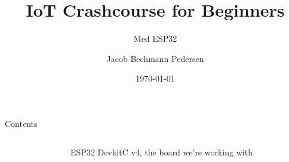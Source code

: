 \documentclass[aspectratio=169]{beamer}
\title{IoT Crashcourse for Beginners}
\subtitle{Med ESP32}
\author{Jacob Bechmann Pedersen}
\institute{Bechmann Engineering ApS}
\date{\today}
\begin{document}
\begin{frame}
	\titlepage
\end{frame}

\begin{frame}{Contents}
	\begin{columns}
	\begin{column}{0.6\textwidth}
		\begin{fitBox}
			\tableofcontents{}
		\end{fitBox}
	\end{column}
	\begin{column}{0.4\textwidth}
		\centering
		\begin{figure}
  			
  			\caption{ESP32 DevkitC v4, the board we're working with}
  			\label{fig:esp32}
		\end{figure}
	\end{column}
	\end{columns}	
\end{frame}
\end{document}
